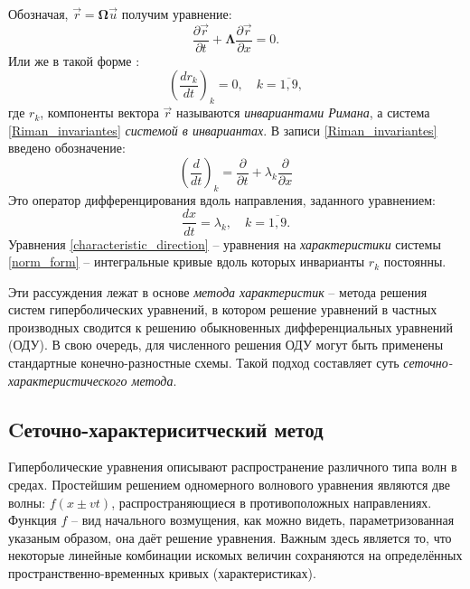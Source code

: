 	Обозначая, $\vec{r} = \mathbf{\Omega}\vec{u}$ получим уравнение:
\begin{equation}
	\label{Riman_invariantes}
	\frac{\partial\vec{r}}{\partial{t}}+\mathbf{\Lambda}\frac{\partial\vec{r}}{\partial{x}} = 0.
\end{equation}
	Или же в такой форме \cite{kukudzhanov_main}:
\begin{equation}
	\label{Riman_invariantes1}
	\left(\frac{dr_k}{dt}\right)_k = 0, \quad k = \overline{1, 9},
\end{equation}
	где $r_k$, компоненты вектора $\vec{r}$ называются \textit{инвариантами Римана}, а система \eqref{Riman_invariantes} \textit{системой в инвариантах}.
	В записи \eqref{Riman_invariantes} введено обозначение:
\begin{equation}
	\label{notation}
	\left(\frac{d}{dt}\right)_k = \frac{\partial}{\partial{t}} + \lambda_k \frac{\partial}{\partial{x}}
\end{equation}
	Это оператор дифференцирования вдоль направления, заданного уравнением:
\begin{equation}
	\label{characteristic_direction}
	\frac{dx}{dt} = \lambda_k, \quad k = \overline{1, 9}.
\end{equation}
	Уравнения \eqref{characteristic_direction} -- уравнения на \textit{характеристики} системы \eqref{norm_form} -- интегральные кривые вдоль которых инварианты $r_k$ постоянны. 
	
	Эти рассуждения лежат в основе \textit{метода характеристик} -- метода решения систем гиперболических уравнений, в котором решение уравнений в частных производных сводится к решению обыкновенных дифференциальных уравнений (ОДУ).
	В свою очередь, для численного решения ОДУ могут быть применены стандартные конечно-разностные схемы. Такой подход составляет суть \textit{сеточно-характеристического метода}. 
	
\subsection{Cеточно-характериситческий метод}

	Гиперболические уравнения описывают распространение различного типа волн в средах.
	Простейшим решением одномерного волнового уравнения являются две волны: $f(x \pm vt)$, распространяющиеся в противоположных направлениях.
	Функция $f$ -- вид начального возмущения, как можно видеть, параметризованная указаным образом, она даёт решение уравнения.
	Важным здесь является то, что некоторые линейные комбинации искомых величин сохраняются на определённых пространственно-временных кривых (характеристиках).

